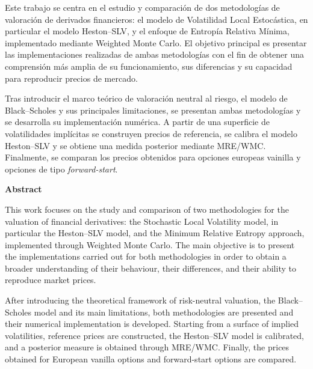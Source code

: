 

Este trabajo se centra en el estudio y comparación de dos metodologías de valoración de derivados financieros: el modelo de Volatilidad Local Estocástica, en particular el modelo Heston--SLV, y el enfoque de Entropía Relativa Mínima, implementado mediante Weighted Monte Carlo. El objetivo principal es presentar las implementaciones realizadas de ambas metodologías con el fin de obtener una comprensión más amplia de su funcionamiento, sus diferencias y su capacidad para reproducir precios de mercado. \medskip

Tras introducir el marco teórico de valoración neutral al riesgo, el modelo de Black--Scholes y sus principales limitaciones, se presentan ambas metodologías y se desarrolla su implementación numérica. A partir de una superficie de volatilidades implícitas se construyen precios de referencia, se calibra el modelo Heston--SLV y se obtiene una medida posterior mediante MRE/WMC. Finalmente, se comparan los precios obtenidos para opciones europeas vainilla y opciones de tipo \textit{forward-start}.


\vspace{1cm}

\noindent\textbf{\Large Abstract} 

\vspace{1.5cm}

This work focuses on the study and comparison of two methodologies for the valuation of financial derivatives: the Stochastic Local Volatility model, in particular the Heston--SLV model, and the Minimum Relative Entropy approach, implemented through Weighted Monte Carlo. The main objective is to present the implementations carried out for both methodologies in order to obtain a broader understanding of their behaviour, their differences, and their ability to reproduce market prices. \medskip

After introducing the theoretical framework of risk-neutral valuation, the Black--Scholes model and its main limitations, both methodologies are presented and their numerical implementation is developed. Starting from a surface of implied volatilities, reference prices are constructed, the Heston--SLV model is calibrated, and a posterior measure is obtained through MRE/WMC. Finally, the prices obtained for European vanilla options and forward-start options are compared.



